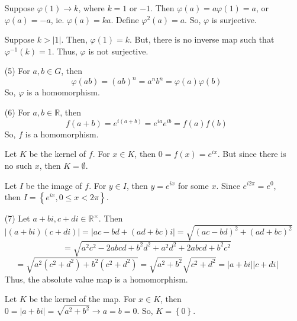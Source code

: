 \documentclass[12pt]{article}
\begin{document}
\begin{itemize}
Suppose $\varphi(1) \rightarrow k$, where $k = 1$ or $-1$. Then $\varphi(a) = a\varphi(1) = a$, or $\varphi(a) = -a$, ie. $\varphi(a) = ka$. Define $\varphi^2(a) = a$. So, $\varphi$ is surjective.

Suppose $k > |1|$. Then, $\varphi(1) = k$. But, there is no inverse map such that $\varphi^{-1}(k) = 1$. Thus, $\varphi$ is not surjective.
\item[(5)]
For $a, b \in G$, then
$$\varphi(ab) = (ab)^n = a^nb^n = \varphi(a)\varphi(b)$$
So, $\varphi$ is a homomorphism.
\item[(6)]
For $a, b \in \mathbb{R}$, then
$$f(a+b) = e^{i(a+b)} = e^{ia}e^{ib} = f(a)f(b)$$
So, $f$ is a homomorphism. 

Let $K$ be the kernel of $f$. For $x \in K$, then $0 = f(x) = e^{ix}$. But since there is no such $x$, then $K = \emptyset$.

Let $I$ be the image of $f$. For $y \in I$, then $y = e^{ix}$ for some $x$. Since $e^{i2\pi} = e^0$, then $I = \left\lbrace e^{ix}, 0 \leq x < 2\pi \right\rbrace$. 
\item[(7)]
Let $a + bi, c + di \in \mathbb{R}^\times$. Then
$$|(a+bi)(c+di)| = |ac - bd + (ad + bc)i| = \sqrt{(ac-bd)^2 + (ad+bc)^2}$$
$$= \sqrt{a^2c^2 - 2abcd + b^2d^2 + a^2d^2 + 2abcd + b^2c^2}$$ 
$$= \sqrt{a^2(c^2 + d^2) + b^2(c^2 + d^2)} = \sqrt{a^2+b^2}\sqrt{c^2+d^2} = |a+bi||c+di|$$
Thus, the absolute value map is a homomorphism.

Let $K$ be the kernel of the map. For $x \in K$, then $0 = |a + bi| = \sqrt{a^2 + b^2} \rightarrow a = b = 0$. So, $K = \left\lbrace 0 \right\rbrace$.


\end{itemize}
\end{document}
